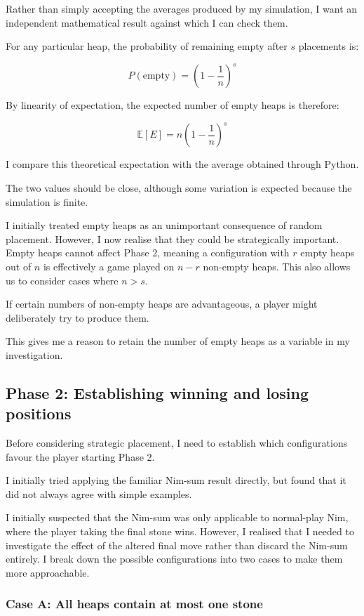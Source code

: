 \documentclass[11pt]{article}
\newcommand{\keywordfont}{\textsc}
\newcommand{\keyword}[1]{%
  \marginpar{\raggedright\small\keywordfont{#1}}}
\begin{document}
Rather than simply accepting \keyword{Maybe} the averages produced by my simulation, I want an independent mathematical result against which I can check them.

For any particular heap, the probability of remaining empty after $s$ placements is:

\[
P(\text{empty})=\left(1-\frac{1}{n}\right)^s
\]

By linearity of expectation, the expected number of empty heaps is therefore:

\[
\mathbb{E}[E]=n\left(1-\frac{1}{n}\right)^s
\]

I compare this theoretical expectation with the average obtained through Python.


The two values should be\keyword{Check} close, although some variation is expected because the simulation is finite.


I initially treated empty heaps \keyword{Aha} as an unimportant consequence of random placement. However, I now realise that they could be strategically important. Empty heaps cannot affect Phase 2, meaning a configuration with $r$ empty heaps out of $n$ is effectively a game played on $n-r$ non-empty heaps. This also allows us to consider cases where $n>s$.

If certain numbers of non-empty heaps are advantageous, a player might deliberately try to produce them.

This gives me a reason to retain the number of empty heaps as a variable in my investigation.

\subsection{Phase 2: Establishing winning and losing positions}

Before considering strategic placement, I need to establish which configurations favour the player starting Phase 2.

I initially tried applying the familiar Nim-sum result directly, but found that it did not always agree with simple examples.


I initially \keyword{Stuck} suspected that the Nim-sum was only applicable to normal-play Nim, where the player taking the final stone wins. However, I realised that I needed to investigate the effect of the altered final move rather than discard the Nim-sum entirely. I break down the possible configurations into two cases to make them more approachable.

\subsubsection{Case A: All heaps contain at most one stone}
\end{document}
